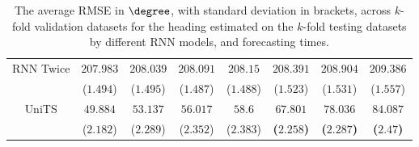 \begin{table}[!ht]
{\begin{tabular}{|c|c|c|c|c|c|c|c|}
			\multirow{2}{*}{RNN Twice} & $207.983$ & $208.039$ & $208.091$ & $208.15$ & $208.391$ & $208.904$ & $209.386$ \\
			 & ($1.494$) & ($1.495$) & ($1.487$) & ($1.488$) & ($1.523$) & ($1.531$) & ($1.557$) \\ \hline
			\multirow{2}{*}{UniTS} & $49.884$ & $53.137$ & $56.017$ & $58.6$ & $\mathbf{67.801}$ & $\mathbf{78.036}$ & $\mathbf{84.087}$ \\
			 & ($2.182$) & ($2.289$) & ($2.352$) & ($2.383$) & \textbf{(}$\mathbf{2.258}$\textbf{)} & \textbf{(}$\mathbf{2.287}$\textbf{)} & \textbf{(}$\mathbf{2.47}$\textbf{)} \\ \hline
		\end{tabular}
	}
	\caption{The average RMSE in $\degree$, with standard deviation in brackets, across $k$-fold validation datasets for the heading estimated on the $k$-fold testing datasets by different RNN models, and forecasting times.}
	\label{tab:all_direction_RMSE}
\end{table}